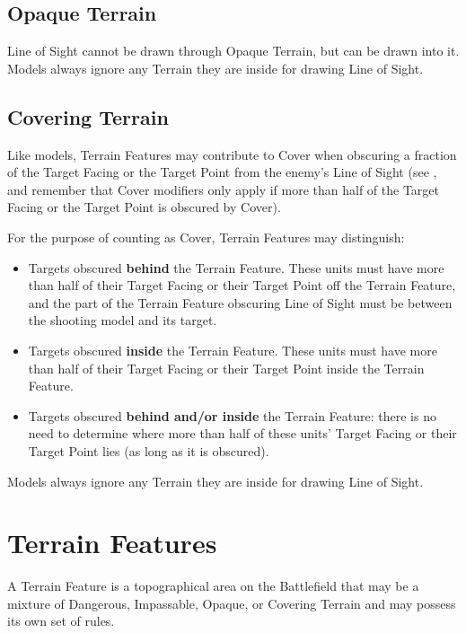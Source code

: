 \subsection{Opaque Terrain}
\label{opaque_terrain}

Line of Sight cannot be drawn through Opaque Terrain, but can be drawn into it. Models always ignore any Terrain they are inside for drawing Line of Sight.

\subsection{Covering Terrain}
\label{covering_terrain}

Like models, Terrain Features may contribute to Cover when obscuring a fraction of the Target Facing or the Target Point from the enemy's Line of Sight (see , and remember that Cover modifiers only apply if more than half of the Target Facing or the Target Point is obscured by Cover).

For the purpose of counting as Cover, Terrain Features may distinguish:

\begin{itemize}
\item Targets obscured \textbf{behind} the Terrain Feature. These units must have more than half of their Target Facing or their Target Point off the Terrain Feature, and the part of the Terrain Feature obscuring Line of Sight must be between the shooting model and its target.
\item Targets obscured \textbf{inside} the Terrain Feature. These units must have more than half of their Target Facing or their Target Point inside the Terrain Feature.
\item Targets obscured \textbf{behind and/or inside} the Terrain Feature: there is no need to determine where more than half of these units' Target Facing or their Target Point lies (as long as it is obscured).
\end{itemize}

Models always ignore any Terrain they are inside for drawing Line of Sight.

\newpage
\section{Terrain Features}
\label{terrain_features}

A Terrain Feature is a topographical area on the Battlefield that may be a mixture of Dangerous, Impassable, Opaque, or Covering Terrain and may possess its own set of rules.

